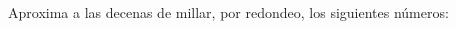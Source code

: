 \documentclass[addpoints,spanish, 12pt,a4paper]{exam}
\renewcommand*\half{.5}
\begin{document}
\begin{questions}




\question[0\half] Aproxima a las decenas de millar, por redondeo, los siguientes números: 
\begin{multicols}{2}
\end{multicols}

    
    
    
    






\end{questions}
\end{document}
